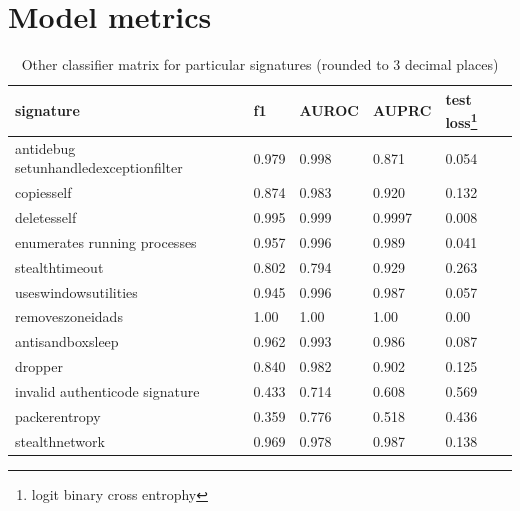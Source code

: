 \chapter{Model metrics} \label{app:models}

\begin{table}[h]
    \centering
    \caption{Other classifier matrix for particular signatures (rounded to 3 decimal places)}
    \begin{minipage}{\linewidth}
    \begin{tabular}{lllll}
      \toprule
      \textbf{signature} &
      \textbf{f1} &
      \textbf{AUROC} &
      \textbf{AUPRC} &
      \textbf{test loss}\footnote{logit binary cross entrophy}
      \\
      \midrule
      antidebug setunhandledexceptionfilter & 0.979 & 0.998 & 0.871 & 0.054  \\
      \midrule
      copiesself &  0.874 & 0.983 & 0.920 & 0.132 \\
      \midrule
      deletesself &  0.995 & 0.999 & 0.9997 & 0.008 \\
      \midrule
      enumerates running processes & 0.957 & 0.996 & 0.989 & 0.041 \\
      \midrule
      stealthtimeout & 0.802 & 0.794 & 0.929 &  0.263 \\
      \midrule
      useswindowsutilities & 0.945 & 0.996 & 0.987 &  0.057 \\
      \midrule
      removeszoneidads & 1.00 & 1.00 & 1.00 & 0.00 \\
      \midrule
      antisandboxsleep & 0.962 & 0.993 & 0.986 & 0.087 \\
      \midrule
      dropper & 0.840 & 0.982 & 0.902 & 0.125 \\
      \midrule
      invalid authenticode signature & 0.433 & 0.714 & 0.608 & 0.569 \\
      \midrule
      packerentropy & 0.359 & 0.776 & 0.518 & 0.436 \\
      \midrule
      stealthnetwork & 0.969 & 0.978 & 0.987 & 0.138 \\
      \bottomrule
    \end{tabular}
    \end{minipage}
    \label{tab:additional_metrics}
  \end{table}


